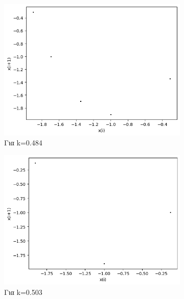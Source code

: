 \begin{figure}[h!]
\begin{subfigure}[b]{0.4\textwidth}
		\includegraphics[width=\textwidth]{LateX images/graphs q19/g5}
		\caption{Για k=0.484}
		\label{f:k94}
	\end{subfigure}
	\hfill
	\begin{subfigure}[b]{0.4\textwidth}
		\centering
		\includegraphics[width=\textwidth]{LateX images/graphs q19/g6}
		\caption{Για k=0.503}
		\label{f:k95}
	\end{subfigure}
	\hfill
	\begin{subfigure}[b]{0.4\textwidth}
		\centering

\end{subfigure}
\end{figure}
